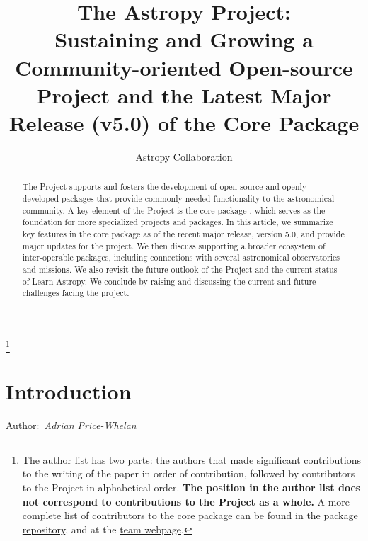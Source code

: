 \documentclass[modern]{aastex631}
\newcommand{\secauthor}[1]{{\color{blue}Author:~\textit{#1}}}
\begin{document}
\draft{\today}

\title{The Astropy Project: \\
       Sustaining and Growing a Community-oriented Open-source Project and
       the Latest Major Release (v5.0) of the Core Package}


\author{Astropy Collaboration}
\noaffiliation
{\let\thefootnote\relax\footnote{{The author list has two parts: the authors that made significant contributions to the writing of the paper in order of contribution, followed by contributors to the \astropy Project in alphabetical order. \textbf{The position in the author list does not correspond to contributions to the \astropy Project as a whole.} A more complete list of contributors to the core package can be found in the \href{https://github.com/astropy/astropy/graphs/contributors}{package repository}, and at the \href{http://www.astropy.org/team.html}{\astropy team webpage}.}}}

% 

\begin{abstract}
The \astropy Project supports and fosters the development of open-source and openly-developed
\python packages that provide commonly-needed functionality to the astronomical
community.
A key element of the \astropy Project is the core package \astropypkg, which serves as the
foundation for more specialized projects and packages.
In this article, we summarize key features in the core package as of the recent major
release, version 5.0, and provide major updates for the project.
We then discuss supporting a broader ecosystem of inter-operable packages,
including connections with several astronomical observatories and missions.
We also revisit the future outlook of the \astropy Project and the current
status of Learn Astropy.
We conclude by raising and discussing the current and future challenges facing the project.
\end{abstract}



\section{Introduction} \label{sec:intro}

\secauthor{Adrian Price-Whelan}
\end{document}
